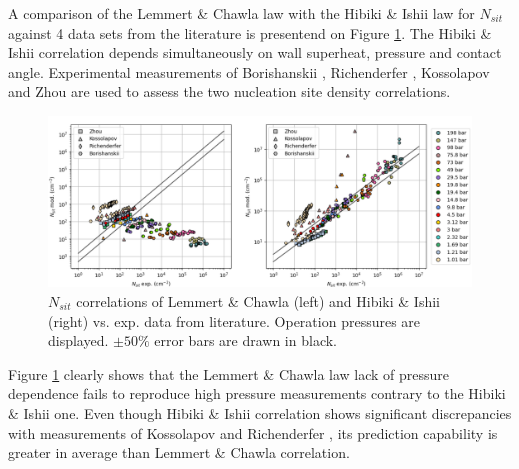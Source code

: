 A comparison of the {Lemmert} \& {Chawla} law\cite{Lemmert1977} with  the {Hibiki} \& {Ishii}\cite{Hibiki2003} law for $N_{sit}$ against 4 data sets from the literature is presentend on Figure \ref{fig:nsit}. The {Hibiki} \& {Ishii} correlation depends simultaneously on wall superheat, pressure and contact angle.  Experimental measurements of {Borishanskii} \etal\cite{Borishanskii1961}, {Richenderfer} \etal\cite{Richenderfer2018}, {Kossolapov} \etal\cite{Kossolapov2020} and {Zhou} \etal\cite{Zhou2020} are used to assess the two nucleation site density correlations.
%
\begin{figure}[h!]
\centering
\includegraphics[scale=0.45]{img/DEBORA/nsit.png}
\caption{$N_{sit}$ correlations of {Lemmert} \& {Chawla} (left) and {Hibiki} \& {Ishii} (right) vs. exp. data from literature. Operation pressures are displayed. $\pm 50\%$ error bars are drawn in black.}
\label{fig:nsit}
\end{figure}
%

Figure \ref{fig:nsit} clearly shows that the {Lemmert} \& {Chawla} law lack of pressure dependence fails to reproduce high pressure measurements contrary to the {Hibiki} \& {Ishii} one. Even though {Hibiki} \& {Ishii} correlation shows significant discrepancies with measurements of {Kossolapov} \etal and {Richenderfer} \etal, its prediction capability is greater in average than {Lemmert} \& {Chawla} correlation.

